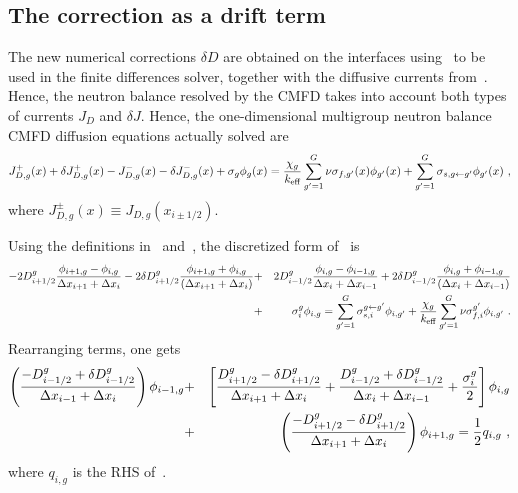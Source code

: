 %
\subsection{The correction as a drift term}
\label{sec:corr-drift}

The new numerical corrections $\delta D$ are obtained on the interfaces using~ to be used in the finite differences solver, together with the diffusive currents from~. Hence, the neutron balance resolved by the CMFD takes into account both types of currents $J_D$ and $\delta J$. %
Hence, the one-dimensional multigroup neutron balance CMFD diffusion equations actually solved are
\begin{equation}\label{eq:diff1}
J_{D,g}^+(x) + \delta J_{D,g}^+(x) -  J_{D,g}^-(x) - \delta J_{D,g}^-(x) + \sigma_{g}\phi_g(x) =  \frac{\chi_g}{{k_{\textrm{\scriptsize{eff}}}}}\sum\limits_{g'=1}^G\nu\sigma_{f,g'}(x)\phi_{g'}(x) + \sum\limits_{g'=1}^G\sigma_{s,g\leftarrow g'}\phi_{g'}(x) \,\, ,
\end{equation}
where $J_{D,g}^\pm (x)\equiv J_{D,g}(x_{i\pm 1/2})$.

Using the definitions in~ and~, the discretized form of~ is
\begin{eqnarray}\label{eq:FD_diff_full}
- 2D_{i+1/2}^g\frac{\phi_{i+1,g}-\phi_{i,g}}{\Delta x_{i+1} + \Delta x_i}
- 2\delta D_{i+1/2}^g\frac{\phi_{i+1,g}+\phi_{i,g}}{(\Delta x_{i+1}+\Delta x_i)}
&+& 2D_{i-1/2}^g\frac{\phi_{i,g}-\phi_{i-1,g}}{\Delta x_{i} + \Delta x_{i-1}}  
+ 2\delta D_{i-1/2}^g\frac{\phi_{i,g}+\phi_{i-1,g}}{(\Delta x_i+\Delta x_{i-1})} 
\nonumber \\
&+& \sigma_{i}^g \phi_{i,g} 
= \sum\limits_{g'=1}^G \sigma_{s,i}^{g\leftarrow g'}\phi_{i,g'}
+ \frac{\chi_g}{{k_{\textrm{\scriptsize{eff}}}}}\sum\limits_{g'=1}^G
 \nu\sigma_{f,i}^{g'}\phi_{i,g'} 
\,\,.
\end{eqnarray}
Rearranging terms, one gets
\begin{eqnarray}\label{eq:FD_diff_org}
\left(
\frac{-D_{i-1/2}^g + \delta D_{i-1/2}^g }{\Delta x_{i-1}+\Delta x_{i}}
\right)
\phi_{i-1,g}
&+&\left[
\frac{D_{i+1/2}^g - \delta D_{i+1/2}^g}{\Delta x_{i+1}+\Delta x_i}
+\frac{D_{i-1/2}^g + \delta D_{i-1/2}^g}{\Delta x_{i}+\Delta x_{i-1}}
+\frac{\sigma_{i}^g}{2}
\right]
\phi_{i,g}
\nonumber \\
&+&\left(
\frac{-D_{i+1/2}^g -\delta D_{i+1/2}^g }{\Delta x_{i+1}+\Delta x_{i}}
\right)
\phi_{i+1,g} =
\frac{1}{2}q_{i,g}\,\, ,
\end{eqnarray}
where $q_{i,g}$ is the RHS of~.

